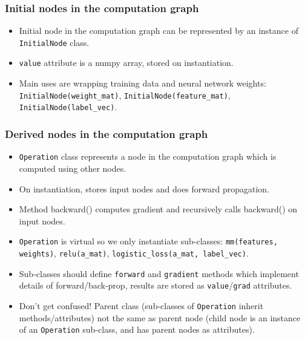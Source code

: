 \documentclass{beamer}
\begin{document}
\begin{frame}
  \frametitle{Initial nodes in the computation graph}
  \begin{itemize}
  \item Initial node in the computation graph can be represented by an
    instance of \texttt{InitialNode} class.
  \item \texttt{value} attribute is a numpy array, 
    stored on instantiation.
  \item Main uses are wrapping training data and neural network
    weights: \texttt{InitialNode(weight\_mat)},
    \texttt{InitialNode(feature\_mat)},
    \texttt{InitialNode(label\_vec)}.
  \end{itemize}


\end{frame}

\begin{frame}
  \frametitle{Derived nodes in the computation graph}
  \begin{itemize}
  \item \texttt{Operation} class represents a node in the computation
    graph which is computed using other nodes.
  \item On instantiation, stores input nodes and does forward
    propagation.
  \item Method backward() computes gradient and recursively calls
    backward() on input nodes.
  \item \texttt{Operation} is virtual so we only instantiate sub-classes:
    \texttt{mm(features, weights)},
    \texttt{relu(a\_mat)},
    \texttt{logistic\_loss(a\_mat, label\_vec)}.
  \item Sub-classes should define \texttt{forward} and
    \texttt{gradient} methods which implement details of
    forward/back-prop, results are stored as \texttt{value}/\texttt{grad}
    attributes.
  \item Don't get confused! Parent class (sub-classes of
    \texttt{Operation} inherit methods/attributes) not the same as
    parent node (child node is an instance of an \texttt{Operation}
    sub-class, and has parent nodes as attributes). 
  \end{itemize}
\end{frame}
\end{document}
